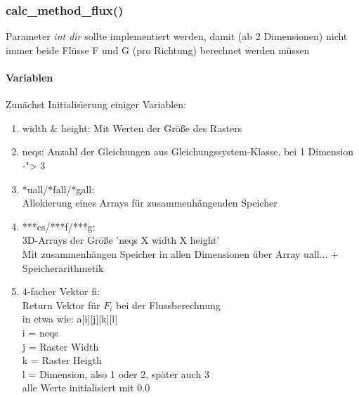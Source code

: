 \documentclass[12pt]{article}
\begin{document}
\subsubsection{calc\_method\_flux()} \label{sssec:laxcalc}
Parameter {\em int dir} sollte implementiert werden, damit (ab 2 Dimensionen) nicht immer beide Flüsse F und G (pro Richtung) berechnet werden müssen
\paragraph{Variablen}
Zunächst Initialisierung einiger Variablen:
\begin{enumerate}
	\item width \& height: Mit Werten der Größe des Rasters
	\item neqs: Anzahl der Gleichungen aus Gleichungssystem-Klasse, bei 1 Dimension -"> 3
	\item *uall/*fall/*gall: 
	\\Allokierung eines Arrays für zusammenhängenden Speicher
	\item ***cs/***f/***g: 
	\\3D-Arrays der Größe 'neqs X width X height'
	\\Mit zusammenhängen Speicher in allen Dimensionen über Array uall... + Speicherarithmetik
	\item 4-facher Vektor fi: 
	\\ Return Vektor für $F_{i}$ bei der Flussberechnung
	\\ in etwa wie: a[i][j][k][l]
	\\ i = neqs
	\\ j = Raster Width
	\\ k = Raster Heigth
	\\ l = Dimension, also 1 oder 2, später auch 3
	\\ alle Werte initialisiert mit 0.0
\end{enumerate}

\renewcommand{\labelenumi}{\theenumi.} 
\end{document}
